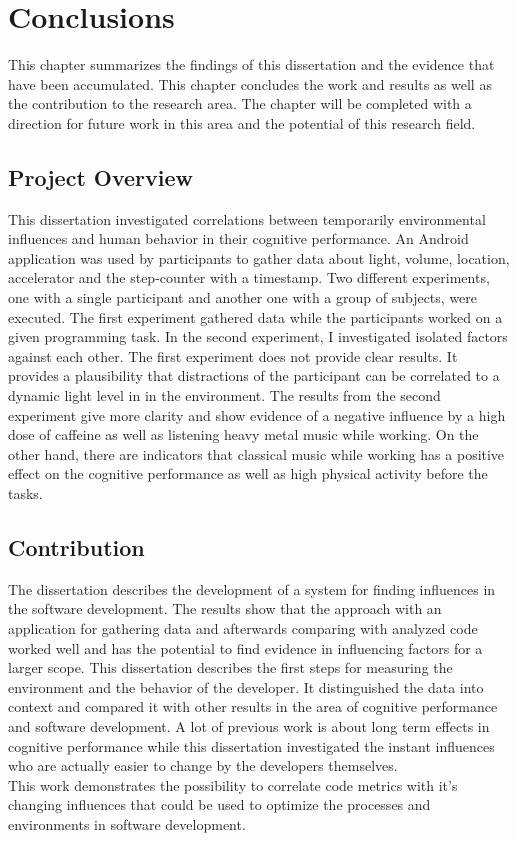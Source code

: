 \chapter{Conclusions}
This chapter summarizes the findings of this dissertation and the evidence that have been accumulated. This chapter concludes the work and results as well as the contribution to the research area. 
The chapter will be completed with a direction for future work in this area and the potential of this research field. 

\section{Project Overview}
This dissertation investigated correlations between temporarily environmental influences and human behavior in their cognitive performance. 
An Android application was used by participants to gather data about light, volume, location, accelerator and the step-counter with a timestamp.  
Two different experiments, one with a single participant and another one with a group of subjects, were executed. The first experiment gathered data while the participants worked on a given programming task. In the second experiment, I investigated isolated factors against each other.
The first experiment does not provide clear results. It provides a plausibility that distractions of the participant can be correlated to a dynamic light level in in the environment. 
The results from the second experiment give more clarity and show evidence of a negative influence by a high dose of caffeine as well as listening heavy metal music while working. On the other hand, there are indicators that classical music while working has a positive effect on the cognitive performance  as well as high physical activity before the tasks. 

\section{Contribution}
The dissertation describes the development of a system for finding influences in the software development. The results show that the approach with an application for gathering data and afterwards comparing with analyzed code worked well and has the potential to find evidence in influencing factors for a larger scope. 
\bigbreak
This dissertation describes the first steps for measuring the environment and the behavior of the developer. It distinguished the data into context and compared it with other results in the area of cognitive performance and software development. A lot of previous work is about long term effects in cognitive performance while this dissertation investigated the instant influences who are actually easier to change by the developers themselves. \\
This work demonstrates the possibility to correlate code metrics with it's changing influences that could be used to optimize the processes and environments in software development. 

